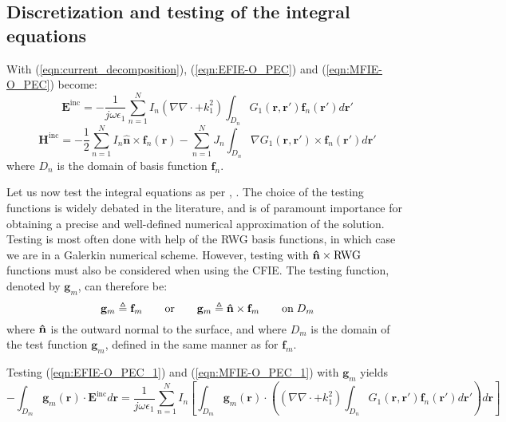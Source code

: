 \documentclass[a4paper,10pt]{book}
\newcommand{\field}[1]{\mathbf{#1}}
\newcommand{\current}[1]{\mathbf{#1}}
\newcommand{\vect}[1]{\mathbf{#1}}
\newcommand{\uvect}[1]{\ensuremath{\mathbf{\Hat{#1}}}}
\renewcommand{\arg}[1]{\ensuremath{\!\left(#1\right)}}
\begin{document}
\subsection{Discretization and testing of the integral equations}
%
\par
With (\ref{eqn:current_decomposition}), (\ref{eqn:EFIE-O_PEC}) and (\ref{eqn:MFIE-O_PEC}) become:
\begin{equation}\label{eqn:EFIE-O_PEC_1}
\field{E}^\text{inc} =  - \frac{1}{j \omega \epsilon_1} \sum_{n=1}^{N} I_n \left(\nabla \nabla \cdot + k_1^2\right) \int_{D_n} G_1\left(\vect{r}, \vect{r}'\right) \current{f}_n\left(\vect{r}'\right) d\vect{r}'
\end{equation}
\begin{equation}\label{eqn:MFIE-O_PEC_1}
\field{H}^\text{inc} = - \frac{1}{2} \sum_{n=1}^{N} I_n \vect{\hat{n}} \times \current{f}_{n}\arg{\vect{r}} - \sum_{n=1}^{N} J_n \int_{D_n} \nabla G_1\left(\vect{r}, \vect{r}'\right) \times \current{f}_n\left(\vect{r}'\right) d\vect{r}'
\end{equation}
where $D_n$ is the domain of basis function $\vect{f}_n$.
%
\par
Let us now test the integral equations as per \cite{Har_68}, \cite{Rao_82}. The choice of the testing functions is widely debated in the literature, and is of paramount importance for obtaining a precise and well-defined numerical approximation of the solution. Testing is most often done with help of the RWG basis functions, in which case we are in a Galerkin numerical scheme.  However, testing with $\uvect{n} \times \text{RWG}$ functions must also be considered when using the CFIE. The testing function, denoted by $\vect{g}_m$, can therefore be:
\begin{equation}
\vect{g}_m \triangleq \vect{f}_m \qquad \text{or} \qquad \vect{g}_m \triangleq \uvect{n} \times \vect{f}_m \qquad \text{on} \; D_m
\end{equation}
where $\uvect{n}$ is the outward normal to the surface, and where $D_m$ is the domain of the test function $\vect{g}_m$, defined in the same manner as for $\vect{f}_m$.
%
\par
Testing (\ref{eqn:EFIE-O_PEC_1}) and (\ref{eqn:MFIE-O_PEC_1}) with $\vect{g}_m$ yields
\begin{equation}\label{eqn:EFIE-O_PEC_2}
\boxed{-\int_{D_m}\vect{g}_m \arg{\vect{r}} \cdot \field{E}^\text{inc} d\vect{r} =  \frac{1}{j \omega \epsilon_1} \sum_{n=1}^{N} I_n \left[\int_{D_m}\vect{g}_m \arg{\vect{r}} \cdot \left( \left(\nabla \nabla \cdot + k_1^2\right) \int_{D_n} G_1\left(\vect{r}, \vect{r}'\right) \current{f}_n\left(\vect{r}'\right) d\vect{r}' \right) d\vect{r} \right]}
\end{equation}
\end{document}
